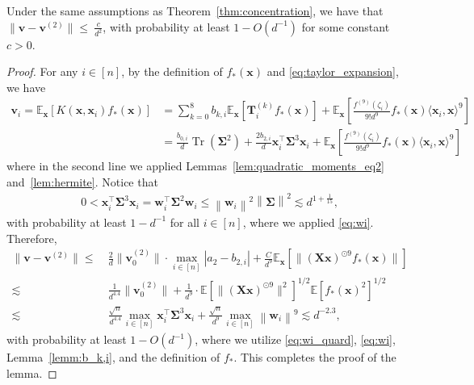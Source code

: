 \documentclass[twoside,11pt]{article}
\newcommand{\norm}[1]{\left\|#1\right\|}
\newcommand{\bw}{\boldsymbol{w}}
\newcommand{\E}{\mathbb{E}}
\def\bT{{\boldsymbol T}}
\def\bX{{\boldsymbol X}}
\def\bv{{\boldsymbol v}}
\def\bw{{\boldsymbol w}}
\def\bx{{\boldsymbol x}}
\def\bSigma{{\boldsymbol \Sigma}}
\newcommand{\Tr}{\operatorname{Tr}}
\newcommand{\1}{\mathbf{1}}
\begin{document}
\begin{lemma}\label{lemma:diff_v_det}
Under the same assumptions as Theorem~\ref{thm:concentration}, we have that
        $\|\bv-\bv^{(2)}\|\le ~ \frac{c }{d^{2}}$,
    with probability  at least $1-O(d^{-1})$ for some constant $c>0$.
\end{lemma}
\begin{proof}
For any $i\in [n]$, by the definition of $f_*(\bx)$ and \eqref{eq:taylor_expansion}, we have
\begin{align}
\bv_i=\E_{\bx}[K(\bx,\bx_i)f_*(\bx)]
&=\sum_{k=0}^8b_{k,i}\E_{\bx}[ \bT_{i}^{(k)}f_*(\bx)]+\E_{\bx}\left[\frac{f^{(9)}(\zeta_{i})}{9!d^9}f_*(\bx)\langle \bx_i,\bx \rangle^9\right]\\
&=\frac{b_{0,i}}{d}\Tr(\bSigma^2) + \frac{2b_{2,i}}{d}\bx_i^\top\bSigma^3\bx_i+\E_{\bx}\left[\frac{f^{(9)}(\zeta_{i})}{9!d^9}f_*(\bx)\langle \bx_i,\bx \rangle^9\right]
\end{align}
where in the second line we applied Lemmas~\ref{lem:quadratic_moments_eq2} and~\ref{lem:hermite}. Notice that
\begin{align}\label{eq:wi_quard}
0<\bx_i^\top\bSigma^3\bx_i=\bw_i^\top\bSigma^{2} \bw_i\le \norm{\bw_i}^2\norm{\bSigma}^2\lesssim d^{1+\frac{1}{15}},
\end{align}with probability at least $1-d^{-1}$ for all $i\in[n]$,
where we applied \eqref{eq:wi}.
Therefore,
\begin{align}
    \|\bv-\bv^{(2)}\|\le ~&\frac{2}{d}\|\bv_0^{(2)}\|\cdot\max_{i\in [n]}|a_2-b_{2,i}|+\frac{C}{d^9}\E_{\bx}[\|(\bX\bx)^{\odot 9} f_*(\bx)\|]\\
    \lesssim~& \frac{1}{d^{4.4}}\|\bv_0^{(2)}\|+\frac{1}{d^9} \cdot \E[\|(\bX\bx)^{\odot 9}\|^2]^{1/2}\E[f_*(\bx)^2]^{1/2}\\
    \lesssim~& \frac{\sqrt{n}}{d^{4.4}}\max_{i\in [n]}\bx_i^\top\bSigma^3\bx_i+\frac{\sqrt{n}}{d^9} \max_{i\in [n]}\norm{\bw_i}^9\lesssim d^{-2.3}, 
\end{align} 
with probability at least $1-O(d^{-1})$, where we utilize \eqref{eq:wi_quard}, \eqref{eq:wi}, Lemma~\ref{lemm:b_k,i}, and the definition of $f_*$. This completes the proof of the lemma.
\end{proof}
\end{document}
